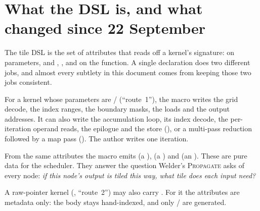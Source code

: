\section{What the DSL is, and what changed since 22 September}

The tile DSL is the set of attributes that  reads off a kernel's
signature: \code{#[tile(...)]} on parameters, and ,
,  and  on the
function. A single declaration does two different jobs, and almost every subtlety
in this document comes from keeping those two jobs consistent.

\begin{description}[leftmargin=1.2em]
\item[It generates code.] For a kernel whose parameters are  /
   (``route~1''), the macro writes the grid decode, the index
  ranges, the boundary masks, the loads and the output addresses. It can also write
  the accumulation loop, its index decode, the per-iteration operand reads, the
  epilogue and the store (), or a multi-pass reduction
  followed by a map pass (). The author writes one
  iteration.
\item[It describes the kernel.] From the same attributes the macro emits
   (a ),  (a
  ) and  (an ). These
  are pure data for the scheduler. They answer the question Welder's
  \textsc{Propagate} asks of every node: \emph{if this node's output is tiled this
  way, what tile does each input need?}
\end{description}

A raw-pointer kernel (, ``route~2'') may also carry
\code{#[tile(...)]}. For it the attributes are metadata only: the body stays
hand-indexed, and only / are generated.

